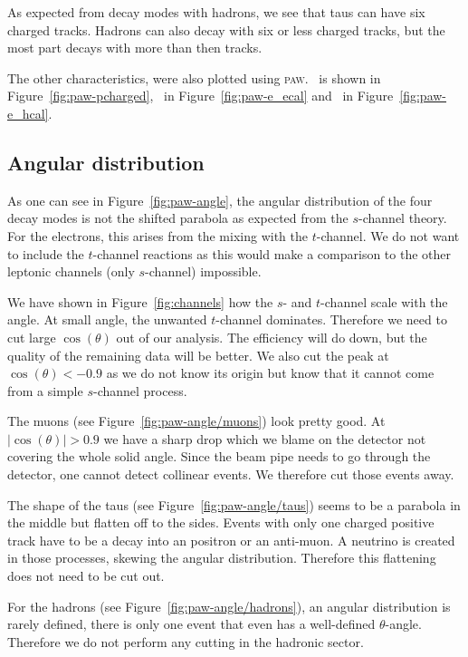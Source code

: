 \documentclass[11pt, english, fleqn, DIV=15, headinclude, BCOR=2cm]{scrreprt}
\begin{document}
As expected from decay modes with hadrons, we see that taus can have six
charged tracks. Hadrons can also decay with six or less charged tracks, but the
most part decays with more than then tracks.

The other characteristics, were also plotted using \textsc{paw}. \pcharged\ is
shown in Figure~\ref{fig:paw-pcharged}, \eecal\ in Figure~\ref{fig:paw-e_ecal}
and \ehcal\ in Figure~\ref{fig:paw-e_hcal}.

\subsection{Angular distribution}

As one can see in Figure~\ref{fig:paw-angle}, the angular distribution of the
four decay modes is not the shifted parabola as expected from the $s$-channel
theory. For the electrons, this arises from the mixing with the $t$-channel. We
do not want to include the $t$-channel reactions as this would make a
comparison to the other leptonic channels (only $s$-channel) impossible.

We have shown in Figure~\ref{fig:channels} how the $s$- and $t$-channel scale
with the angle. At small angle, the unwanted $t$-channel dominates. Therefore
we need to cut large $\cos(\theta)$ out of our analysis. The efficiency will do
down, but the quality of the remaining data will be better. We also cut the
peak at $\cos(\theta) < -0.9$ as we do not know its origin but know that it
cannot come from a simple $s$-channel process.



The muons (see Figure~\ref{fig:paw-angle/muons}) look pretty good. At
$|\cos(\theta)| > 0.9$ we have a sharp drop which we blame on the detector not
covering the whole solid angle. Since the beam pipe needs to go through the
detector, one cannot detect collinear events. We therefore cut those events
away.

The shape of the taus (see Figure~\ref{fig:paw-angle/taus}) seems to be a
parabola in the middle but flatten off to the sides. Events with only one
charged positive track have to be a decay into an positron or an anti-muon. A
neutrino is created in those processes, skewing the angular distribution.
Therefore this flattening does not need to be cut out.

For the hadrons (see Figure~\ref{fig:paw-angle/hadrons}), an angular
distribution is rarely defined, there is only one event that even has a
well-defined $\theta$-angle. Therefore we do not perform any cutting in the
hadronic sector.
\end{document}
